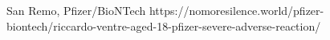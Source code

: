           {San Remo, }
          {}
          {Pfizer/BioNTech}
          {}
          {
          }
          {https://nomoresilence.world/pfizer-biontech/riccardo-ventre-aged-18-pfizer-severe-adverse-reaction/}



